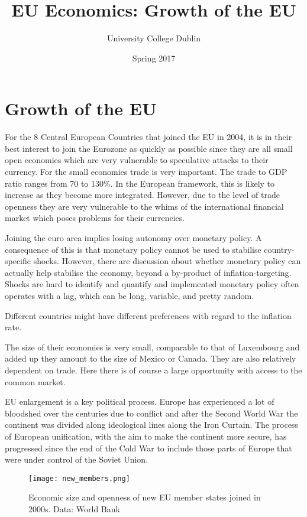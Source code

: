 \documentclass{tufte-handout}
\title{EU Economics: Growth of the EU}
\author{University College Dublin}
\date{Spring 2017}
\begin{document}
\maketitle  
\section{Growth of the EU}
For the 8 Central European Countries that joined the EU in 2004, it is in their best interest to join the Eurozone as quickly as possible since they are all small open economies which are very vulnerable to speculative attacks to their currency. 
For the small economies trade is very important. 
The trade to GDP ratio ranges from 70 to 130\%. 
In the European framework, this is likely to increase as they become more integrated. 
However, due to the level of trade openness they are very vulnerable to the whims of the international financial market which poses problems for their currencies. 

Joining the euro area implies losing autonomy over monetary policy. 
A consequence of this is that monetary policy cannot be used to stabilise country-specific shocks. 
However, there are discussion about whether monetary policy can actually help stabilise the economy, beyond a by-product of inflation-targeting. 
Shocks are hard to identify and quantify and implemented monetary policy often operates with a lag, which can be long, variable, and pretty random. 

Different countries might have different preferences with regard to the inflation rate. 


The size of their economies is very small, comparable to that of Luxembourg and added up they amount to the size of Mexico or Canada. 
They are also relatively dependent on trade. 
Here there is of course a large opportunity with access to the common market. 



EU enlargement is a key political process. 
Europe has experienced a lot of bloodshed over the centuries due to conflict and after the Second World War the continent was divided along ideological lines along the Iron Curtain. 
The process of European unification, with the aim to make the continent more secure, has progressed since the end of the Cold War to include those parts of Europe that were under control of the Soviet Union. 
\begin{figure} \centering
    \texttt{[image: new\_members.png]}
    \caption{Economic size and openness of new EU member states joined in 2000s. Data: World Bank}
    \label{fig:new_members}
  \end{figure}
\end{document}
